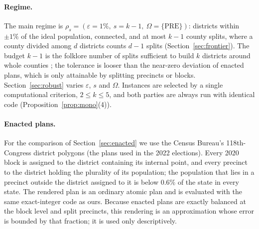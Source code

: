 \paragraph{Regime.}
The main regime is $\rho_s=(\varepsilon=1\%,\ s=k-1,\ \Omega=\{\mathrm{PRE}\})$: districts within $\pm1\%$ of the ideal population, connected, and at most $k-1$ county splits, where a county divided among $d$ districts counts $d-1$ splits (Section~\ref{sec:frontier}). The budget $k-1$ is the folklore number of splits sufficient to build $k$ districts around whole counties \citep{shahmizad2025}; the tolerance is looser than the near-zero deviation of enacted plans, which is only attainable by splitting precincts or blocks. Section~\ref{sec:robust} varies $\varepsilon$, $s$ and $\Omega$. Instances are selected by a single computational criterion, $2\le k\le5$, and both parties are always run with identical code (Proposition~\ref{prop:mono}(4)).

\begin{table}[!tbp]
\centering\small
\caption{Instances (2020 precincts). ``Straddle'' counts precincts assigned to one of several counties they overlap; ``Bridges'' are artificial edges joining islands.}\label{tab:instances}
\end{table}

\paragraph{Enacted plans.}
For the comparison of Section~\ref{sec:enacted} we use the Census Bureau's 118th-Congress district polygons \citep{tiger2022cd} (the plans used in the 2022 elections). Every 2020 block is assigned to the district containing its internal point, and every precinct to the district holding the plurality of its population; the population that lies in a precinct outside the district assigned to it is below 0.6\% of the state in every state. The rendered plan is an ordinary atomic plan and is evaluated with the same exact-integer code as ours. Because enacted plans are exactly balanced at the block level and split precincts, this rendering is an approximation whose error is bounded by that fraction; it is used only descriptively.


